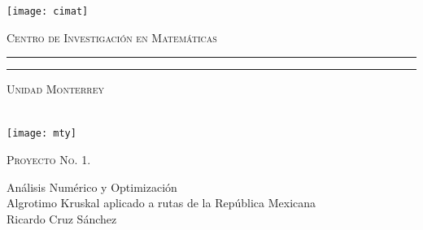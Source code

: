 \documentclass[14pt, letterpaper]{article}
\begin{document}
\thispagestyle{empty}


\thispagestyle{empty}

\begin{minipage}[c][0.1\textheight][c]{0.2\textwidth}
\begin{center}
    \texttt{[image: cimat]}
\end{center}
\end{minipage}
\begin{minipage}[c][0.1\textheight][t]{0.8\textwidth}
\begin{center}
    {\hspace{2cm}\scshape Centro de Investigación en Matemáticas}
    \vspace{-.5cm}
\end{center}
\hspace*{1.0cm} \rule[0mm]{0.9\textwidth}{0.8mm}
\hspace*{1.17cm}   \rule[4mm]{0.9\textwidth}{0.1mm}
    \vspace{-1cm}
\begin{center}
    { \hspace{2cm}\scshape  Unidad Monterrey}
\end{center}
\end{minipage}

\begin{minipage}[c][0.6\textheight][t]{0.2\textwidth}
\begin{center}
\hskip2pt
\vrule width2.5pt height10cm
        \hskip1mm
        \vrule width1pt height10cm \\ \vspace{2cm}
        \texttt{[image: mty]}
        \end{center}
\end{minipage}
\begin{minipage}[c][0.9\textheight][t]{0.65\textwidth}
  \begin{center}

	
    \vspace{3.2cm}
    

  \scshape Proyecto No. 1.\\ \normalsize
  
  \vspace{2cm}  
  
    
            
    Análisis Numérico y Optimización\\
    \vspace{1cm}   
    Algrotimo Kruskal aplicado a rutas de la República Mexicana\\
    \vspace{1cm}   
    \vspace{1cm}   
    Ricardo Cruz Sánchez\\
    \vspace{.5cm}   
  \end{center}
  
\end{minipage}
\end{document}
